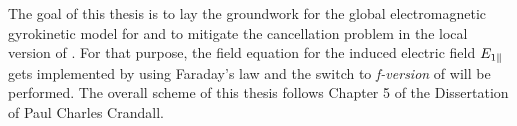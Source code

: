 The goal of this thesis is to lay the groundwork for the global electromagnetic gyrokinetic model for {\gkw} and to mitigate the cancellation problem in the local version of {\gkw}. For that purpose, the field equation for the induced electric field $E_{1\parallel}$ gets implemented by using Faraday's law and the switch to \textit{f-version} of {\gkw} will be performed. The overall scheme of this thesis follows Chapter 5 of the Dissertation of Paul Charles Crandall\cite{Crandall_PHD}. 